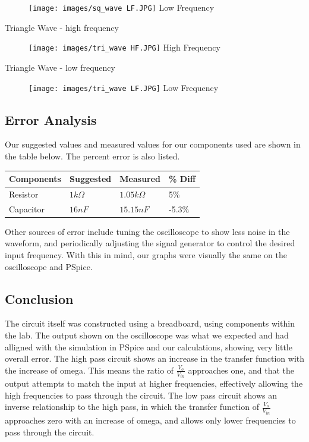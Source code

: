 \documentclass[11pt]{article}
\begin{document}
	\begin{figure}[H]
		\centering
		\texttt{[image: images/sq\_wave LF.JPG]}
		Low Frequency
	\end{figure}
	\newpage
	Triangle Wave - high frequency
	\begin{figure}[H]
		\centering
		\texttt{[image: images/tri\_wave HF.JPG]}
		High Frequency
	\end{figure}
	Triangle Wave - low frequency
	
	\begin{figure}[H]
		\centering
		\texttt{[image: images/tri\_wave LF.JPG]}
		Low Frequency
	\end{figure}
	\newpage
	\subsection*{Error Analysis}
	Our suggested values and measured values for our components used are shown in the table below. The percent error is also listed.
	\begin{table}[H]
		\def\arraystretch{1.2}%
		\centering
		\begin{tabular}{|l|l|l|l|}
			
			\hline
			Components       	& Suggested 		& Measured      	&\% Diff	\\ \hline
			Resistor  	    	& $1 k\Omega$		& $1.05 k\Omega$   & 5\%	     \\ \hline	
			Capacitor			& $16 n F$			& $15.15 nF$		& -5.3\%		\\ \hline
		\end{tabular}
	\end{table}
	Other sources of error include tuning the oscilloscope to show less noise in the waveform, and periodically adjusting the signal generator to control the desired input frequency. With this in mind, our graphs were visually the same on the oscilloscope and PSpice.
	\subsection*{Conclusion}
	The circuit itself was constructed using a breadboard, using components within the lab. The output shown on the oscilloscope was what we expected and had alligned with the simulation in PSpice and our calculations, showing very little overall error. 
	The high pass circuit shows an increase in the transfer function with the increase of omega. This means the ratio of $\frac{V_{o}}{V_{in}}$ approaches one, and that the output attempts to match the input at higher frequencies, effectively allowing the high frequencies to pass through the circuit. 
	The low pass circuit shows an inverse relationship to the high pass, in which the transfer function of $\frac{V_{o}}{V_{in}}$ approaches zero with an increase of omega, and allows only lower frequencies to pass through the circuit. 
	\newpage
\end{document}
